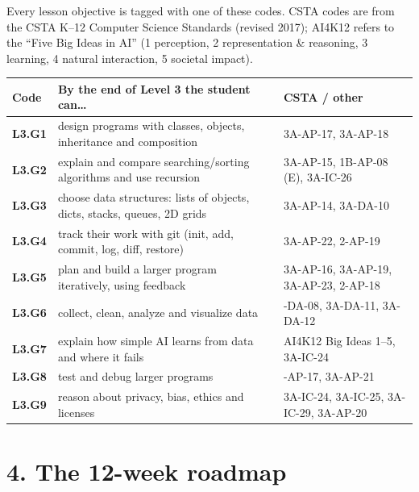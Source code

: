 \documentclass[level=3,teacher]{kidscode}
\begin{document}
Every lesson objective is tagged with one of these codes. CSTA codes are from the CSTA K--12
Computer Science Standards (revised 2017); AI4K12 refers to the \enquote{Five Big Ideas in AI}
(1 perception, 2 representation \& reasoning, 3 learning, 4 natural interaction, 5 societal impact).

\renewcommand{\arraystretch}{1.25}
\begin{tabularx}{\linewidth}{@{}>{\bfseries}p{1.3cm}X>{\raggedright\arraybackslash}p{3.9cm}@{}}
\toprule
\rowcolor{kcaccent!15} Code & By the end of Level 3 the student can\ldots & CSTA / other\\ \midrule
L3.G1 & design programs with classes, objects, inheritance and composition & 3A-AP-17, 3A-AP-18\\
L3.G2 & explain and compare searching/sorting algorithms and use recursion & 3A-AP-15, 1B-AP-08 (E), 3A-IC-26\\
L3.G3 & choose data structures: lists of objects, dicts, stacks, queues, 2D grids & 3A-AP-14, 3A-DA-10\\
L3.G4 & track their work with git (init, add, commit, log, diff, restore) & 3A-AP-22, 2-AP-19\\
L3.G5 & plan and build a larger program iteratively, using feedback & 3A-AP-16, 3A-AP-19, 3A-AP-23, 2-AP-18\\
L3.G6 & collect, clean, analyze and visualize data & 2-DA-08, 3A-DA-11, 3A-DA-12\\
L3.G7 & explain how simple AI learns from data and where it fails & AI4K12 Big Ideas 1--5, 3A-IC-24\\
L3.G8 & test and debug larger programs & 2-AP-17, 3A-AP-21\\
L3.G9 & reason about privacy, bias, ethics and licenses & 3A-IC-24, 3A-IC-25, 3A-IC-29, 3A-AP-20\\
\bottomrule
\end{tabularx}

\section{4. The 12-week roadmap}
\end{document}
